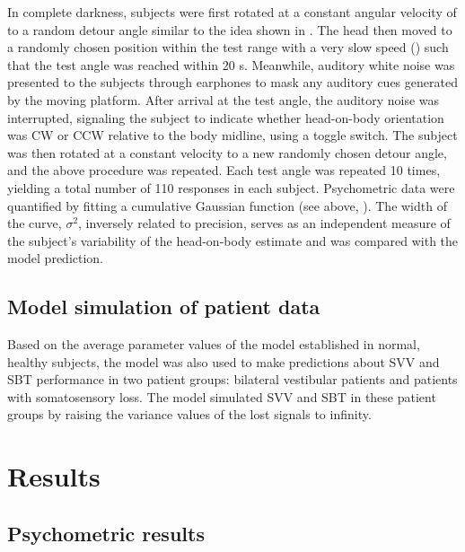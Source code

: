 In complete darkness, subjects were first rotated at a constant angular velocity of  to a random detour angle similar to the idea shown in . The head then moved to a randomly chosen position within the test range with a very slow speed () such that the test angle was reached within 20 \si{\second}. Meanwhile, auditory white noise was presented to the subjects through earphones to mask any auditory cues generated by the moving platform. After arrival at the test angle, the auditory noise was interrupted, signaling the subject to indicate whether head-on-body orientation was CW or CCW relative to the body midline, using a toggle switch. The subject was then rotated at a constant velocity to a new randomly chosen detour angle, and the above procedure was repeated. Each test angle was repeated 10 times, yielding a total number of 110 responses in each subject. Psychometric data were quantified by fitting a cumulative Gaussian function (see above, ). The width of the curve, $\sigma^2$, inversely related to precision, serves as an independent measure of the subject's variability of the head-on-body estimate and was compared with the model prediction. 

\subsection{Model simulation of patient data}

Based on the average parameter values of the model established in normal, healthy subjects, the model was also used to make predictions about SVV and SBT performance in two patient groups: bilateral vestibular patients and patients with somatosensory loss. The model simulated SVV and SBT in these patient groups by raising the variance values of the lost signals to infinity. 



\section{Results}

\subsection{Psychometric results}
 

